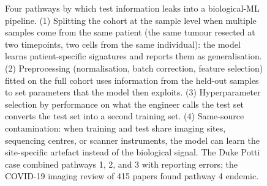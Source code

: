 \begin{figure}[htbp]
\begin{tikzpicture}
\end{tikzpicture}
\caption[Data-leakage pathways in biological ML]{Four pathways by
which test information leaks into a biological-ML pipeline. (1)
Splitting the cohort at the sample level when multiple samples come
from the same patient (the same tumour resected at two timepoints,
two cells from the same individual): the model learns
patient-specific signatures and reports them as generalisation. (2)
Preprocessing (normalisation, batch correction, feature selection)
fitted on the full cohort uses information from the held-out
samples to set parameters that the model then exploits. (3)
Hyperparameter selection by performance on what the engineer calls
the test set converts the test set into a second training set. (4)
Same-source contamination: when training and test share imaging
sites, sequencing centres, or scanner instruments, the model can
learn the site-specific artefact instead of the biological signal.
The Duke Potti case combined pathways 1, 2, and 3 with reporting
errors; the COVID-19 imaging review of 415 papers found pathway 4
endemic.}
\label{fig:vol06:ch11:ml-leakage}
\end{figure}
